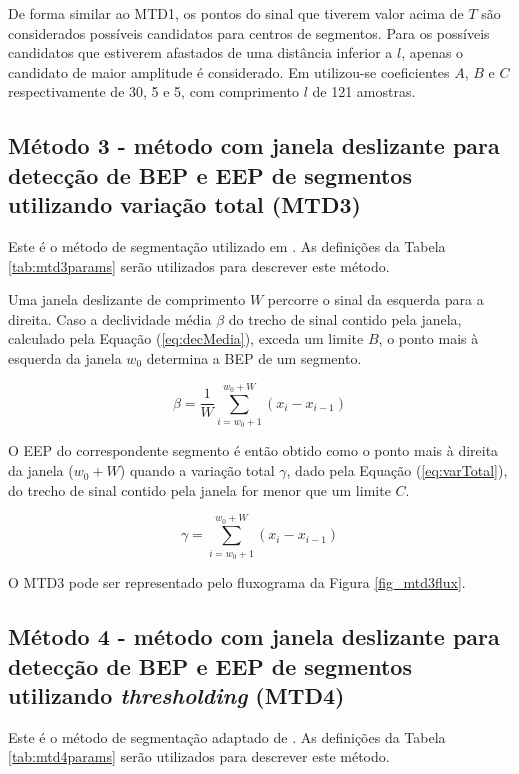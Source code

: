 

De forma similar ao MTD1, os pontos do sinal que tiverem valor acima de $T$ são considerados possíveis candidatos para centros de segmentos. Para os possíveis candidatos que estiverem afastados de uma distância inferior a $l$, apenas o candidato de maior amplitude é considerado. Em \cite{Katsis2006} utilizou-se coeficientes $A$, $B$ e $C$ respectivamente de 30, 5 e 5, com comprimento $l$ de 121 amostras.

			\subsection{Método 3 - método com janela deslizante para detecção de BEP e EEP de segmentos utilizando variação total (MTD3)}
Este é o método de segmentação utilizado em \cite{Gut2000}. As definições da Tabela \ref{tab:mtd3params} serão utilizados para descrever este método.



Uma janela deslizante de comprimento $W$ percorre o sinal da esquerda para a direita. Caso a declividade média $\beta$ do trecho de sinal contido pela janela, calculado pela Equação (\ref{eq:decMedia}), exceda um limite $B$, o ponto mais à esquerda da janela $w_0$ determina a BEP de um segmento.

\begin{equation}
\label{eq:decMedia}
	\beta = \frac{1}{W}\sum\limits_{i=w_0+1}^{w_0+W} (x_i - x_{i-1})
\end{equation}

O EEP do correspondente segmento é então obtido como o ponto mais à direita da janela ($w_0 + W$) quando a variação total $\gamma$, dado pela Equação (\ref{eq:varTotal}), do trecho de sinal contido pela janela for menor que um limite $C$.

\begin{equation}
\label{eq:varTotal}
	\gamma = \sum\limits_{i=w_0+1}^{w_0+W} (x_i - x_{i-1})
\end{equation}

O MTD3 pode ser representado pelo fluxograma da Figura \ref{fig_mtd3flux}.



			\subsection{Método 4 - método com janela deslizante para detecção de BEP e EEP de segmentos utilizando \emph{thresholding} (MTD4)}
Este é o método de segmentação adaptado de \cite{Pattichis1995}. As definições da Tabela \ref{tab:mtd4params} serão utilizados para descrever este método.

